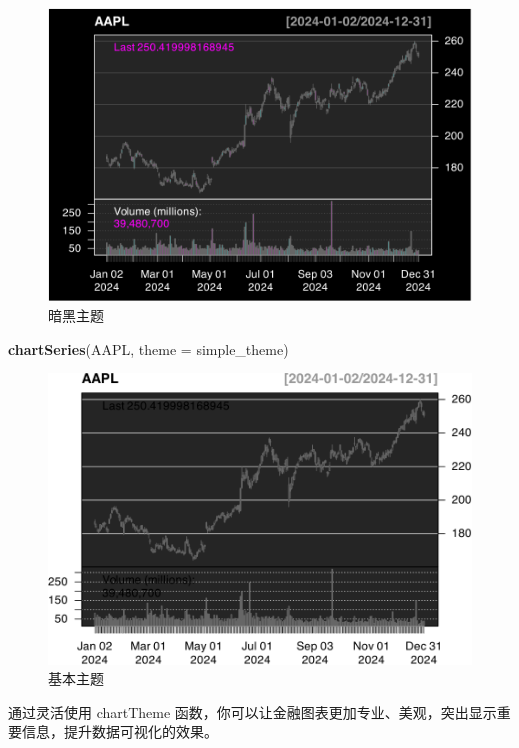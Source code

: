 \documentclass[]{ctexbook}
\newenvironment{Shaded}{\begin{snugshade}}{\end{snugshade}}
\newcommand{\AttributeTok}[1]{\textcolor[rgb]{0.13,0.29,0.53}{#1}}
\newcommand{\FunctionTok}[1]{\textcolor[rgb]{0.13,0.29,0.53}{\textbf{#1}}}
\newcommand{\NormalTok}[1]{#1}
\begin{document}
\begin{figure}
\includegraphics[width=0.9\linewidth]{quantmod_files/figure-latex/createtheme-1} \caption{暗黑主题}\label{fig:createtheme}
\end{figure}

\begin{Shaded}
\begin{Highlighting}[]
\FunctionTok{chartSeries}\NormalTok{(AAPL, }\AttributeTok{theme =}\NormalTok{ simple\_theme)}
\end{Highlighting}
\end{Shaded}

\begin{figure}
\includegraphics[width=0.9\linewidth]{quantmod_files/figure-latex/simpleTheme-1} \caption{基本主题}\label{fig:simpleTheme}
\end{figure}

通过灵活使用 chartTheme 函数，你可以让金融图表更加专业、美观，突出显示重要信息，提升数据可视化的效果。
\end{document}

